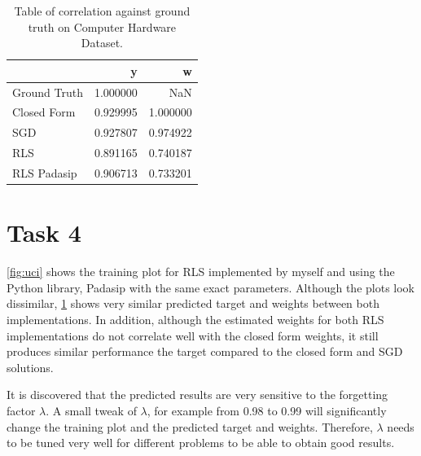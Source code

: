\documentclass{article}
\begin{document}
\begin{table}[h!]
    \centering
    \caption{Table of correlation against ground truth on Computer Hardware Dataset.}
    \label{tab:task3_corr}
    \begin{tabular}{lrr}
    \toprule
    {} &         y &  w \\
    \midrule
    Ground Truth &  1.000000 &       NaN \\
    Closed Form  &  0.929995 &  1.000000 \\
    SGD          &  0.927807 &  0.974922 \\
    RLS          &  0.891165 &  0.740187 \\
    RLS Padasip  &  0.906713 &  0.733201 \\
    \bottomrule
    \end{tabular}
\end{table}


\section{Task 4}

\cref{fig:uci} shows the training plot for RLS implemented by myself and using the Python library, Padasip with the same exact parameters. Although the plots look dissimilar, \cref{tab:task3_corr} shows very similar predicted target and weights between both implementations. In addition, although the estimated weights for both RLS implementations do not correlate well with the closed form weights, it still produces similar performance the target compared to the closed form and SGD solutions.

It is discovered that the predicted results are very sensitive to the forgetting factor $\lambda$. A small tweak of $\lambda$, for example from 0.98 to 0.99 will significantly change the training plot and the predicted target and weights. Therefore, $\lambda$ needs to be tuned very well for different problems to be able to obtain good results.

\printbibliography
\end{document}
